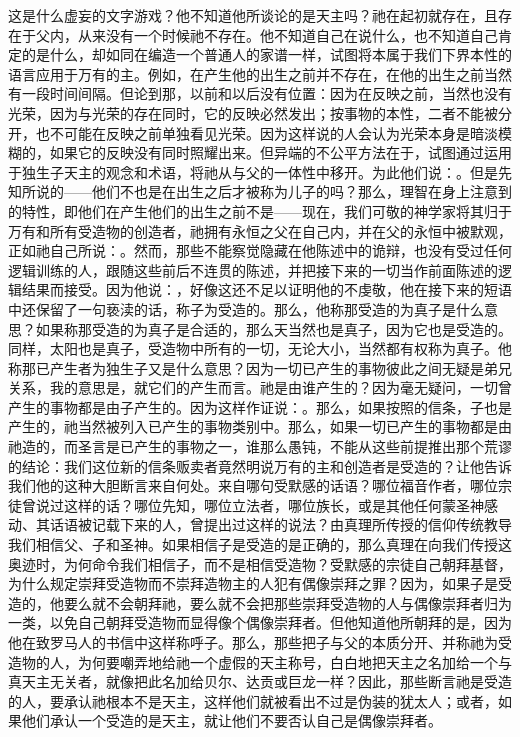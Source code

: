 这是什么虚妄的文字游戏？他不知道他所谈论的是天主吗？祂在起初就存在，且存在于父内，从来没有一个时候祂不存在。他不知道自己在说什么，也不知道自己肯定的是什么，却如同在编造一个普通人的家谱一样，试图将本属于我们下界本性的语言应用于万有的主。例如，在产生他的出生之前并不存在，在他的出生之前当然有一段时间间隔。但论到那，以前和以后没有位置：因为在反映之前，当然也没有光荣，因为与光荣的存在同时，它的反映必然发出；按事物的本性，二者不能被分开，也不可能在反映之前单独看见光荣。因为这样说的人会认为光荣本身是暗淡模糊的，如果它的反映没有同时照耀出来。但异端的不公平方法在于，试图通过运用于独生子天主的观念和术语，将祂从与父的一体性中移开。为此他们说：。但是先知所说的——他们不也是在出生之后才被称为儿子的吗？那么，理智在身上注意到的特性，即他们在产生他们的出生之前不是——现在，我们可敬的神学家将其归于万有和所有受造物的创造者，祂拥有永恒之父在自己内，并在父的永恒中被默观，正如祂自己所说：。然而，那些不能察觉隐藏在他陈述中的诡辩，也没有受过任何逻辑训练的人，跟随这些前后不连贯的陈述，并把接下来的一切当作前面陈述的逻辑结果而接受。因为他说：，好像这还不足以证明他的不虔敬，他在接下来的短语中还保留了一句亵渎的话，称子为受造的。那么，他称那受造的为真子是什么意思？如果称那受造的为真子是合适的，那么天当然也是真子，因为它也是受造的。同样，太阳也是真子，受造物中所有的一切，无论大小，当然都有权称为真子。他称那已产生者为独生子又是什么意思？因为一切已产生的事物彼此之间无疑是弟兄关系，我的意思是，就它们的产生而言。祂是由谁产生的？因为毫无疑问，一切曾产生的事物都是由子产生的。因为这样作证说：。那么，如果按照的信条，子也是产生的，祂当然被列入已产生的事物类别中。那么，如果一切已产生的事物都是由祂造的，而圣言是已产生的事物之一，谁那么愚钝，不能从这些前提推出那个荒谬的结论：我们这位新的信条贩卖者竟然明说万有的主和创造者是受造的？让他告诉我们他的这种大胆断言来自何处。来自哪句受默感的话语？哪位福音作者，哪位宗徒曾说过这样的话？哪位先知，哪位立法者，哪位族长，或是其他任何蒙圣神感动、其话语被记载下来的人，曾提出过这样的说法？由真理所传授的信仰传统教导我们相信父、子和圣神。如果相信子是受造的是正确的，那么真理在向我们传授这奥迹时，为何命令我们相信子，而不是相信受造物？受默感的宗徒自己朝拜基督，为什么规定崇拜受造物而不崇拜造物主的人犯有偶像崇拜之罪？因为，如果子是受造的，他要么就不会朝拜祂，要么就不会把那些崇拜受造物的人与偶像崇拜者归为一类，以免自己朝拜受造物而显得像个偶像崇拜者。但他知道他所朝拜的是，因为他在致罗马人的书信中这样称呼子。那么，那些把子与父的本质分开、并称祂为受造物的人，为何要嘲弄地给祂一个虚假的天主称号，白白地把天主之名加给一个与真天主无关者，就像把此名加给贝尔、达贡或巨龙一样？因此，那些断言祂是受造的人，要承认祂根本不是天主，这样他们就被看出不过是伪装的犹太人；或者，如果他们承认一个受造的是天主，就让他们不要否认自己是偶像崇拜者。\par

